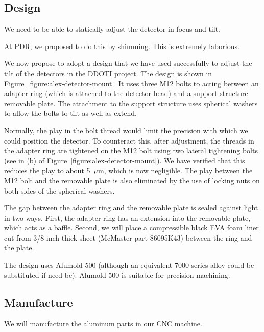 \documentclass{article}
\newcommand{\micron}{\mbox{$\mu$m}}
\begin{document}
\subsection{Design}

We need to be able to statically adjust the detector in focus and tilt.

At PDR, we proposed to do this by shimming. This is extremely laborious. 

We now propose to adopt a design that we have used successfully to adjust the tilt of the detectors in the DDOTI project. The design is shown in Figure~\ref{figure:alex-detector-mount}. It uses three M12 bolts to acting between an adapter ring (which is attached to the detector head) and a support structure removable plate. The attachment to the support structure uses spherical washers to allow the bolts to tilt as well as extend.

Normally, the play in the bolt thread would limit the precision with which we could position the detector. To counteract this, after adjustment, the threads in the adapter ring are tightened on the M12 bolt using two lateral tightening bolts (see in (b) of Figure~\ref{figure:alex-detector-mount}). We have verified that this reduces the play to about 5~{\micron}, which is now negligible. The play between the M12 bolt and the removable plate is also eliminated by the use of locking nuts on both sides of the spherical washers.

The gap between the adapter ring and the removable plate is sealed against light in two ways. First, the adapter ring has an extension into the removable plate, which acts as a baffle. Second, we will place a compressible black EVA foam liner cut from 3/8-inch thick sheet (McMaster part 86095K43) between the ring and the plate.

The design uses Alumold 500 (although an equivalent 7000-series alloy could be substituted if need be). Alumold 500 is suitable for precision machining.

\subsection{Manufacture}

We will manufacture the aluminum parts in our CNC machine.

%
%
\end{document}
